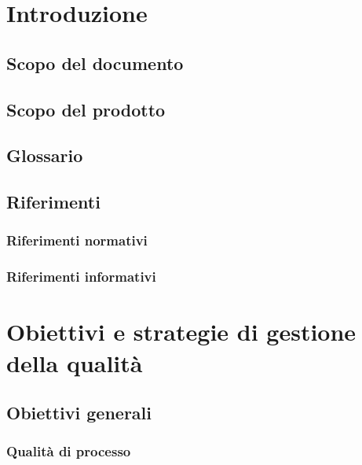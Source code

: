 \documentclass[a4paper, oneside, openany, dvipsnames, table]{article}
\begin{document}
\copertina{}

\newpage
\tableofcontents
\newpage
\listoffigures
\newpage
\listoftables
\newpage
\section{Introduzione}
	\subsection{Scopo del documento}
		
	\subsection{Scopo del prodotto}
		
	\subsection{Glossario}
		
	\subsection{Riferimenti}
		\subsubsection{Riferimenti normativi}
			
		\subsubsection{Riferimenti informativi}
			
	\newpage

\section{Obiettivi e strategie di gestione della qualità}
	\subsection{Obiettivi generali}
		
		\subsubsection{Qualità di processo}
		
\end{document}
